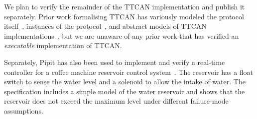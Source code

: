 We plan to verify the remainder of the TTCAN implementation and publish it separately.
Prior work formalising TTCAN has variously modeled the protocol itself~\cite{saha2007finite, pan2014modeling,li2018formal},
instances of the protocol~\cite{guo2020model},
and abstract models of TTCAN implementations~\cite{leen2006modeling}, but we are unaware of any prior work that has verified an \emph{executable} implementation of TTCAN.

Separately, Pipit has also been used to implement and verify a real-time controller for a coffee machine reservoir control system~\cite{robinson2023pipit}.
The reservoir has a float switch to sense the water level and a solenoid to allow the intake of water.
The specification includes a simple model of the water reservoir and shows that the reservoir does not exceed the maximum level under different failure-mode assumptions.
